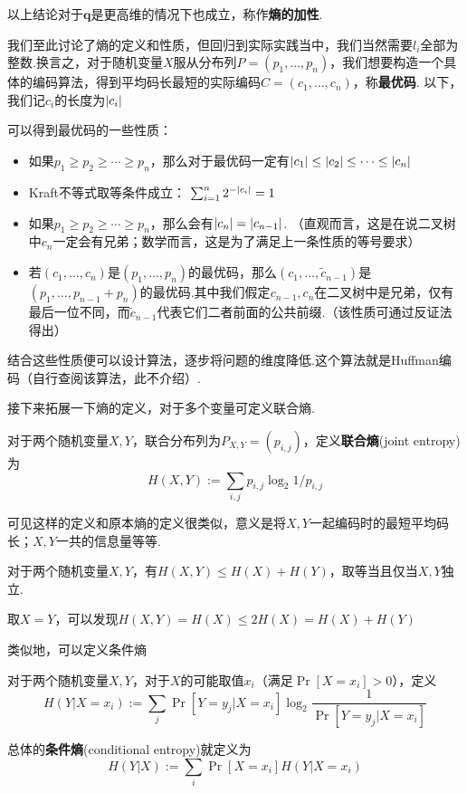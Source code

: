 以上结论对于$\boldsymbol{q}$是更高维的情况下也成立，称作\textbf{熵的加性}. 

我们至此讨论了熵的定义和性质，但回归到实际实践当中，我们当然需要$l_i$全部为整数.换言之，对于随机变量$X$服从分布列$P=(p_1,\dots, p_n)$，我们想要构造一个具体的编码算法，得到平均码长最短的实际编码$C = (c_1, \dots, c_n)$，称\textbf{最优码}. 以下，我们记$c_i$的长度为$\left\vert c_i\right\vert$

可以得到最优码的一些性质：
\begin{itemize}
    \item 如果$p_1 \ge p_2 \ge \cdots \ge p_n$，那么对于最优码一定有$\left\vert c_1\right\vert \le \left\vert c_2\right\vert \le \cdots \le \left\vert c_n\right\vert$ 
    \item Kraft不等式取等条件成立： $\sum_{i=1}^n 2^{-\left\vert c_i\right\vert} = 1$ 
    \item 如果$p_1 \ge p_2 \ge \cdots \ge p_n$，那么会有$\left\vert c_n\right\vert = \left\vert c_{n-1}\right\vert$. （直观而言，这是在说二叉树中$c_n$一定会有兄弟；数学而言，这是为了满足上一条性质的等号要求）
    \item 若$(c_1, \dots, c_n)$是$(p_1,\dots, p_n)$的最优码，那么$(c_1, \dots, \tilde{c}_{n-1})$是$(p_1,\dots, p_{n-1}+p_n)$的最优码.其中我们假定$c_{n-1}, c_n$在二叉树中是兄弟，仅有最后一位不同，而$\tilde{c}_{n-1}$代表它们二者前面的公共前缀.（该性质可通过反证法得出）
\end{itemize}

结合这些性质便可以设计算法，逐步将问题的维度降低.这个算法就是Huffman编码（自行查阅该算法，此不介绍）. 

接下来拓展一下熵的定义，对于多个变量可定义联合熵. 
\begin{definition}[联合熵]
    对于两个随机变量$X,Y$，联合分布列为$P_{X,Y} = (p_{i,j})$，定义\textbf{联合熵}(joint entropy)为 
    \[
    H(X, Y) := \sum_{i,j} p_{i,j} \log_2 1/p_{i,j}
    \]
\end{definition}

可见这样的定义和原本熵的定义很类似，意义是将$X,Y$一起编码时的最短平均码长；$X,Y$一共的信息量等等. 

\begin{theorem}
    对于两个随机变量$X,Y$，有$H(X,Y) \le H(X) + H(Y)$，取等当且仅当$X,Y$独立.
\end{theorem}

\begin{example}
    取$X=Y$，可以发现$H(X, Y) = H(X) \le 2H(X) = H(X) + H(Y)$
\end{example}

类似地，可以定义条件熵
\begin{definition}[条件熵]
    对于两个随机变量$X,Y$，对于$X$的可能取值$x_i$（满足$\Pr[X = x_i] > 0$），定义 
    \[
H(Y|X=x_i) := \sum_{j} \Pr[Y=y_j | X = x_i] \log_2 \dfrac{1}{\Pr[Y=y_j | X = x_i]}
    \]

    总体的\textbf{条件熵}(conditional entropy)就定义为 
    \[
H(Y|X) := \sum_{i} \Pr[X = x_i] H(Y|X=x_i)
    \]
\end{definition} 


